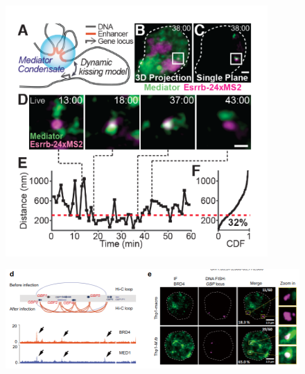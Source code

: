 \documentclass[aspectratio=1610]{beamer}					%
\begin{document}
\begin{frame}{}
\begin{figure}
\includegraphics[width=10cm]{figure-3-1.png}
\end{figure}
\end{frame}

\begin{frame}{}
\begin{figure}
\includegraphics[width=14cm]{figure-4-1.png}
\end{figure}
\end{frame}
\end{document}
